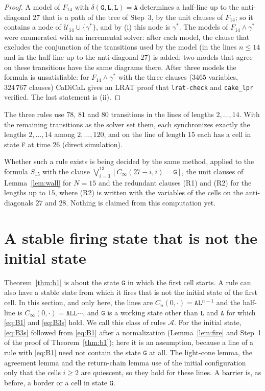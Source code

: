 \documentclass[11pt]{article}
\theoremstyle{remark}
\newcommand{\Lq}{\mathtt{L}}\newcommand{\Gq}{\mathtt{G}}\newcommand{\Aq}{\mathtt{A}}\newcommand{\Bq}{\mathtt{B}}\newcommand{\Fq}{\mathtt{F}}
\begin{document}
\begin{proof}
A model of $F_{14}$ with $\delta(\Gq,\Lq,\Lq)=\Aq$ determines a half-line up to the anti-diagonal $27$ that is a
path of the tree of Step~3, by the unit clauses of $F_{14}$; so it contains a node of
$\mathcal U_{14}\cup\{\gamma^\ast\}$, and by (i) this node is $\gamma^\ast$. The models of
$F_{14}\wedge\gamma^\ast$ were enumerated with an incremental solver: after each model, the clause that excludes
the conjunction of the transitions used by the model (in the lines $n\le14$ and in the half-line up to the
anti-diagonal $27$) is added; two models that agree on these transitions have the same diagrams there. After
three models the formula is unsatisfiable: for $F_{14}\wedge\gamma^\ast$ with the three clauses ($3465$
variables, $324\,767$ clauses) CaDiCaL gives an LRAT proof that \texttt{lrat-check} and \texttt{cake\_lpr}
verified. The last statement is (ii).
\end{proof}

The three rules use $78$, $81$ and $80$ transitions in the lines of lengths $2,\dots,14$. With the remaining
transitions as the solver set them, each synchronizes exactly the lengths $2,\dots,14$ among $2,\dots,120$, and
on the line of length $15$ each has a cell in state $\Fq$ at time $26$ (direct simulation).

Whether such a rule exists is being decided by the same method, applied to the formula $S_{15}$ with the
clause $\bigvee_{i=3}^{13}[C_\infty(27-i,i)=\Gq]$, the unit clauses of Lemma~\ref{lem:wall} for $N=15$ and the
redundant clauses (R1) and (R2) for the lengths up to $15$, where (R2) is written with the variables of the
cells on the anti-diagonals $27$ and $28$. Nothing is claimed from this computation yet.

\section{A stable firing state that is not the initial state}\label{sec:otherfiring}

Theorem~\ref{thm:b1} is about the state $\Gq$ in which the first cell starts. A rule can also have a stable
state from which it fires that is not the initial state of the first cell. In this section, and only here, the
lines are $C_n(0,\cdot)=\Aq\Lq^{n-1}$ and the half-line is $C_\infty(0,\cdot)=\Aq\Lq\Lq\cdots$, and $\Gq$ is a
working state other than $\Lq$ and $\Aq$ for which \eqref{eq:B1} and \eqref{eq:B3s} hold. We call this class of
rules $\mathcal A$. For the initial state, \eqref{eq:B3s} followed from \eqref{eq:B1} after a normalization
(Lemma~\ref{lem:fire} and Step~1 of the proof of Theorem~\ref{thm:b1}); here it is an assumption, because a
line of a rule with \eqref{eq:B1} need not contain the state $\Gq$ at all. The light-cone lemma, the agreement
lemma and the return-chain lemma use of the initial configuration only that the cells $i\ge2$ are quiescent,
so they hold for these lines. A barrier is, as before, a border or a cell in state $\Gq$.
\end{document}
